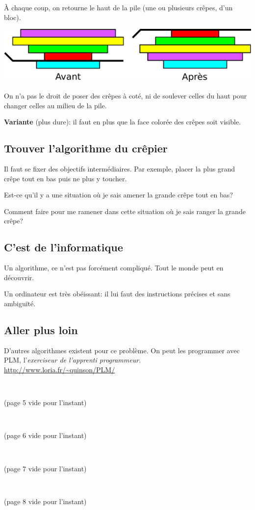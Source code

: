 \documentclass[a7paper,pagesize,DIV=14,10pt]{scrbook}
\begin{document}
À chaque coup, on retourne le haut de la pile (une ou plusieurs crêpes,
d'un bloc).

\smallskip
\includegraphics[width=\linewidth]{img/crepes_un-coup.pdf}

\medskip%
On n'a pas le droit de poser des crêpes à coté, ni de soulever celles
du haut pour changer celles au milieu de la pile.

\bigskip%
\textbf{Variante} (plus dure): il faut en plus que la face colorée des
crêpes soit visible.

\newpage
\subsection*{Trouver l'algorithme du crêpier}
\vspace{-.5\baselineskip}

Il faut se fixer des objectifs intermédiaires. Par exemple, placer la
plus grand crêpe tout en bas puis ne plus y toucher.

\smallskip
Est-ce qu'il y a une situation où je sais amener la grande crêpe tout en bas?

\smallskip
Comment faire pour me ramener dans cette situation où je sais ranger la grande crêpe?

\subsection*{C'est de l'informatique}
\vspace{-.5\baselineskip}

Un algorithme, ce n'est pas forcément compliqué. Tout le monde peut en découvrir.

\smallskip
Un ordinateur est très obéissant: il lui faut des instructions
précises et sans ambiguïté.

\vspace{-.5\baselineskip}
\subsection*{Aller plus loin}
\vspace{-.5\baselineskip}
D'autres algorithmes existent pour ce problème. On peut les programmer
avec PLM, l'\textit{exerciseur de l'apprenti programmeur}.\\
{\small\color{blue}\url{http://www.loria.fr/~quinson/PLM/}}

\newpage ~\vfill \centerline{(page 5 vide pour l'instant)} \vfill
\newpage ~\vfill \centerline{(page 6 vide pour l'instant)} \vfill
\newpage ~\vfill \centerline{(page 7 vide pour l'instant)} \vfill
\newpage ~\vfill \centerline{(page 8 vide pour l'instant)} \vfill
\end{document}
